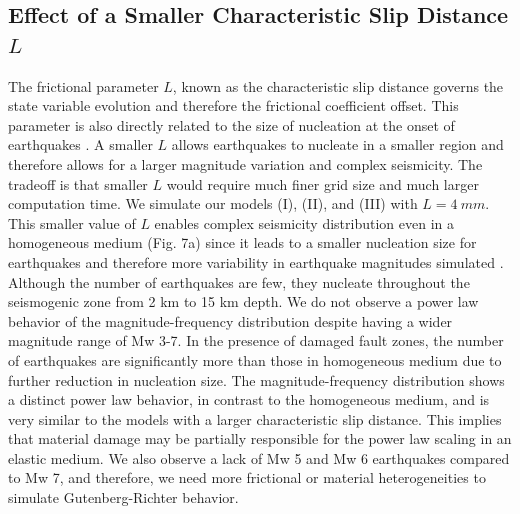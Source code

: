\documentclass[11pt]{article}
\newcommand{\yihe}[1]{{\color{red}#1}}
\begin{document}
\subsection{Effect of a Smaller Characteristic Slip Distance $L$}
The frictional parameter $L$, known as the characteristic slip distance governs the state variable evolution and therefore the frictional coefficient offset. This parameter is also directly related to the size of nucleation at the onset of earthquakes \citep{rubin_ampuero_2005}. A smaller $L$ allows earthquakes to nucleate in a smaller region and therefore allows for a larger magnitude variation and complex seismicity. The tradeoff is that smaller $L$ would require much finer grid size and much larger computation time. We simulate our models (I), (II), and (III) with $L = 4\ mm$. This smaller value of $L$ enables complex seismicity distribution even in a homogeneous medium (Fig. 7a) \yihe{since it leads to a smaller nucleation size for earthquakes and therefore more variability in earthquake magnitudes simulated \citep{lapusta_2000}}. Although the number of earthquakes are few, they nucleate throughout the seismogenic zone from 2 km to 15 km depth. We do not observe a power law behavior of the magnitude-frequency distribution despite having a wider magnitude range of Mw 3-7. In the presence of damaged fault zones, \yihe{the number of earthquakes are significantly more than those in homogeneous medium due to further reduction in nucleation size}. The magnitude-frequency distribution shows a distinct power law behavior, in contrast to the homogeneous medium, and is very similar to the models with a larger characteristic slip distance. This implies that material damage may be partially responsible for the power law scaling in an elastic medium. We also observe a lack of Mw 5 and Mw 6 earthquakes compared to Mw 7, and therefore, we need \yihe{more frictional or material heterogeneities} to simulate Gutenberg-Richter behavior. 
\end{document}
